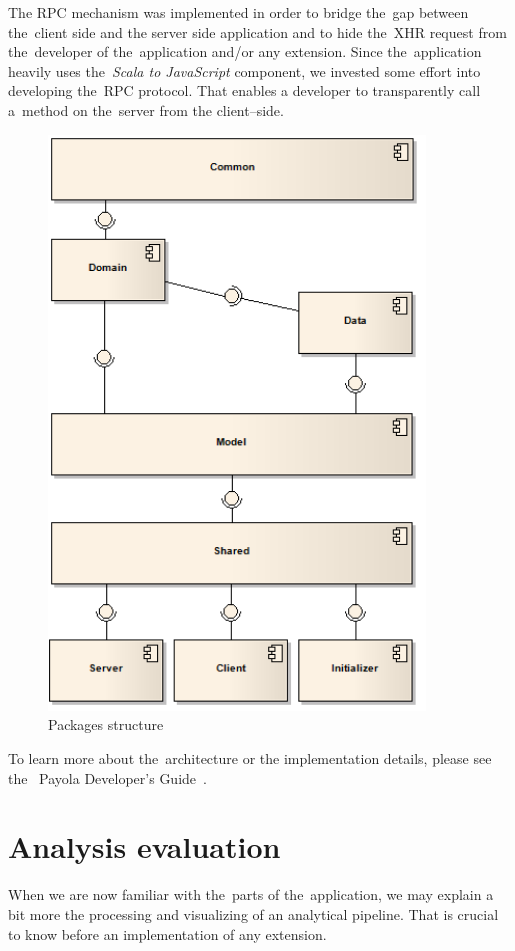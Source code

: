 The RPC mechanism was implemented in order to bridge the~gap between the~client 
side and the server side application and to hide the~XHR request from
the~developer of the~application and/or any extension. Since the~application heavily
uses the~\emph{Scala to JavaScript} component, we invested some effort into developing the~RPC 
protocol. That enables a developer to transparently call a~method on the~server from 
the client--side. 

\begin{figure}
	\centering
	\includegraphics[width=100mm]{images/project_dependencies.png}
	\caption{Packages structure}
	\label{fig:packages-structure}
\end{figure}

To learn more about the~architecture or the implementation details, please see the~
Payola Developer's Guide~\cite{payola:dg}.

\section{Analysis evaluation}
When we are now familiar with the~parts of the~application, we may explain a~
bit more the processing and visualizing of an analytical pipeline. That is 
crucial to know before an implementation of any extension.

